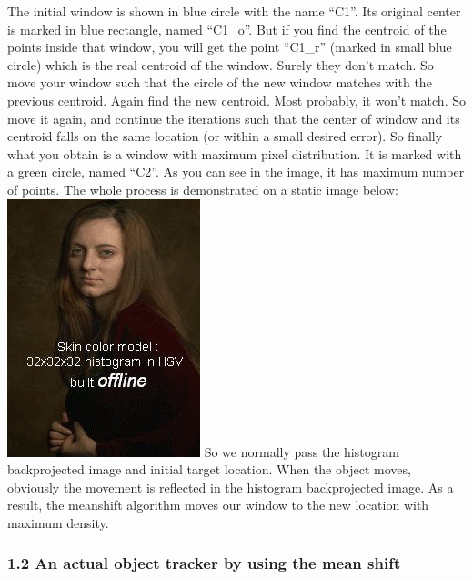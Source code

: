 \documentclass[11pt]{article}
\makeatletter
\def\maxwidth{\ifdim\Gin@nat@width>\linewidth\linewidth
    \else\Gin@nat@width\fi}
\let\Oldincludegraphics\includegraphics
\renewcommand{\includegraphics}[1]{\Oldincludegraphics[width=.8\maxwidth]{#1}}
\makeatother
\begin{document}
The initial window is shown in blue circle with the name ``C1''. Its
original center is marked in blue rectangle, named ``C1\_o''. But if you
find the centroid of the points inside that window, you will get the
point ``C1\_r'' (marked in small blue circle) which is the real centroid
of the window. Surely they don't match. So move your window such that
the circle of the new window matches with the previous centroid. Again
find the new centroid. Most probably, it won't match. So move it again,
and continue the iterations such that the center of window and its
centroid falls on the same location (or within a small desired error).
So finally what you obtain is a window with maximum pixel distribution.
It is marked with a green circle, named ``C2''. As you can see in the
image, it has maximum number of points. The whole process is
demonstrated on a static image below:
\includegraphics{meanshift_face.gif} So we normally pass the histogram
backprojected image and initial target location. When the object moves,
obviously the movement is reflected in the histogram backprojected
image. As a result, the meanshift algorithm moves our window to the new
location with maximum density.

    \hypertarget{an-actual-object-tracker-by-using-the-mean-shift}{%
\subsubsection{1.2 An actual object tracker by using the mean
shift}\label{an-actual-object-tracker-by-using-the-mean-shift}}
\end{document}
